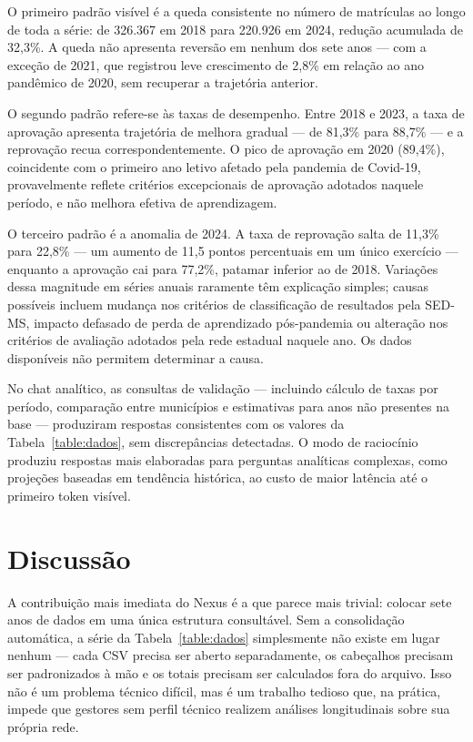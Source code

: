 \documentclass[preprint,10pt,5p]{elsarticle}
\begin{document}
O primeiro padrão visível é a queda consistente no número de matrículas ao longo de toda a
série: de 326.367 em 2018 para 220.926 em 2024, redução acumulada de 32,3\%. A queda não
apresenta reversão em nenhum dos sete anos — com a exceção de 2021, que registrou leve
crescimento de 2,8\% em relação ao ano pandêmico de 2020, sem recuperar a trajetória
anterior.

O segundo padrão refere-se às taxas de desempenho. Entre 2018 e 2023, a taxa de aprovação
apresenta trajetória de melhora gradual — de 81,3\% para 88,7\% — e a reprovação recua
correspondentemente. O pico de aprovação em 2020 (89,4\%), coincidente com o primeiro ano
letivo afetado pela pandemia de Covid-19, provavelmente reflete critérios excepcionais de
aprovação adotados naquele período, e não melhora efetiva de aprendizagem.

O terceiro padrão é a anomalia de 2024. A taxa de reprovação salta de 11,3\% para 22,8\% —
um aumento de 11,5 pontos percentuais em um único exercício — enquanto a aprovação cai para
77,2\%, patamar inferior ao de 2018. Variações dessa magnitude em séries anuais raramente
têm explicação simples; causas possíveis incluem mudança nos critérios de classificação de
resultados pela SED-MS, impacto defasado de perda de aprendizado pós-pandemia ou alteração
nos critérios de avaliação adotados pela rede estadual naquele ano. Os dados disponíveis
não permitem determinar a causa.

No chat analítico, as consultas de validação — incluindo cálculo de taxas por período,
comparação entre municípios e estimativas para anos não presentes na base — produziram
respostas consistentes com os valores da Tabela~\ref{table:dados}, sem discrepâncias
detectadas. O modo de raciocínio produziu respostas mais elaboradas para perguntas
analíticas complexas, como projeções baseadas em tendência histórica, ao custo de maior
latência até o primeiro token visível.


\section{Discussão}
\label{discussion}

A contribuição mais imediata do Nexus é a que parece mais trivial: colocar sete anos de
dados em uma única estrutura consultável. Sem a consolidação automática, a série da
Tabela~\ref{table:dados} simplesmente não existe em lugar nenhum — cada CSV precisa ser
aberto separadamente, os cabeçalhos precisam ser padronizados à mão e os totais precisam
ser calculados fora do arquivo. Isso não é um problema técnico difícil, mas é um trabalho
tedioso que, na prática, impede que gestores sem perfil técnico realizem análises
longitudinais sobre sua própria rede.
\end{document}
